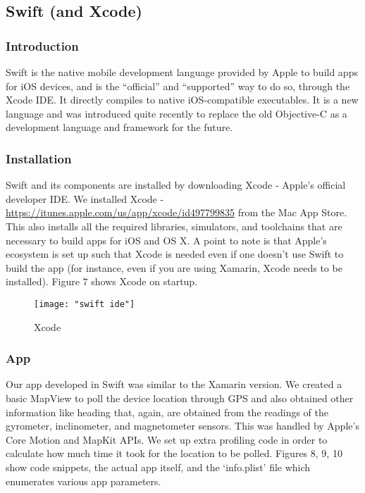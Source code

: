 \documentclass[12pt,a4paper]{article}
\begin{document}
	\subsection{Swift (and Xcode)}
	
    \subsubsection{Introduction}
	
	Swift is the native mobile development language provided by Apple to build apps for iOS devices, and is the ``official'' and ``supported'' way to do so, through the Xcode IDE. It directly compiles to native iOS-compatible executables. It is a new language and was introduced quite recently to replace the old Objective-C as a development language and framework for the future.
	
	\subsubsection{Installation}
	
	Swift and its components are installed by downloading Xcode - Apple's official developer IDE. We installed Xcode - \url{https://itunes.apple.com/us/app/xcode/id497799835} from the Mac App Store. This also installs all the required libraries, simulators, and toolchains that are necessary to build apps for iOS and OS X. A point to note is that Apple's ecosystem is set up such that Xcode is needed even if one doesn't use Swift to build the app (for instance, even if you are using Xamarin, Xcode needs to be installed). Figure 7 shows Xcode on startup.
	
	\begin{figure}
	    \centering
	    \texttt{[image: "swift ide"]}
	    \caption{Xcode}
	\end{figure}
	
	\subsubsection{App}
	
	Our app developed in Swift was similar to the Xamarin version. We created a basic MapView to poll the device location through GPS and also obtained other information like heading that, again, are obtained from the readings of the gyrometer, inclinometer, and magnetometer sensors. This was handled by Apple's Core Motion and MapKit APIs. We set up extra profiling code in order to calculate how much time it took for the location to be polled. Figures 8, 9, 10 show code snippets, the actual app itself, and the `info.plist' file which enumerates various app parameters.
	
\end{document}
